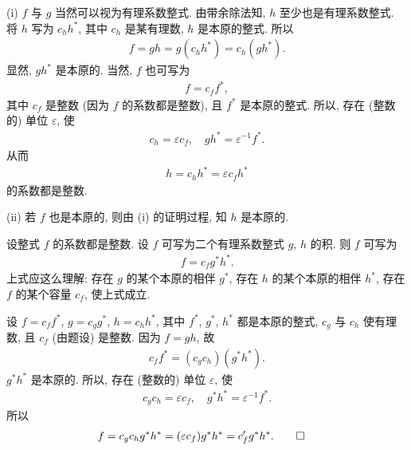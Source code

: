\begin{pf}
    (i) $f$ 与 $g$ 当然可以视为有理系数整式. 由带余除法知, $h$ 至少也是有理系数整式. 将 $h$ 写为 $c_h h^{\ast}$, 其中 $c_h$ 是某有理数, $h$ 是本原的整式. 所以
    \begin{align*}
        f = gh = g(c_h h^{\ast}) = c_h (g h^{\ast}).
    \end{align*}
    显然, $g h^{\ast}$ 是本原的. 当然, $f$ 也可写为
    \begin{align*}
        f = c_f f^{\ast},
    \end{align*}
    其中 $c_f$ 是整数 (因为 $f$ 的系数都是整数), 且 $f^{\ast}$ 是本原的整式. 所以, 存在 (整数的) 单位 $\varepsilon$, 使
    \begin{align*}
        c_h = \varepsilon c_f, \quad g h^{\ast} = \varepsilon^{-1} f^{\ast}.
    \end{align*}
    从而
    \begin{align*}
        h = c_h h^{\ast} = \varepsilon c_f h^{\ast}
    \end{align*}
    的系数都是整数.

    (ii) 若 $f$ 也是本原的, 则由 (i) 的证明过程, 知 $h$ 是本原的.
\end{pf}

\begin{proposition}
    设整式 $f$ 的系数都是整数. 设 $f$ 可写为二个有理系数整式 $g$, $h$ 的积. 则 $f$ 可写为
    \begin{align*}
        f = c_f g^{\ast} h^{\ast}.
    \end{align*}
    上式应这么理解: 存在 $g$ 的某个本原的相伴 $g^{\ast}$, 存在 $h$ 的某个本原的相伴 $h^{\ast}$, 存在 $f$ 的某个容量 $c_f$, 使上式成立.
\end{proposition}

\begin{pf}
    设 $f = c_f f^{\ast}$, $g = c_g g^{\ast}$, $h = c_h h^{\ast}$, 其中 $f^{\ast}$, $g^{\ast}$, $h^{\ast}$ 都是本原的整式, $c_g$ 与 $c_h$ 使有理数, 且 $c_f$ (由题设) 是整数. 因为 $f = gh$, 故
    \begin{align*}
        c_f f^{\ast} = (c_g c_h) (g^{\ast} h^{\ast}).
    \end{align*}
    $g^{\ast} h^{\ast}$ 是本原的. 所以, 存在 (整数的) 单位 $\varepsilon$, 使
    \begin{align*}
        c_g c_h = \varepsilon c_f, \quad g^{\ast} h^{\ast} = \varepsilon^{-1} f^{\ast}.
    \end{align*}
    所以
    \begin{align*}
         & f = c_g c_h g^{\ast} h^{\ast} = (\varepsilon c_f) g^{\ast} h^{\ast} = c_f^{\prime} g^{\ast} h^{\ast}. \qedhere
    \end{align*}
\end{pf}

